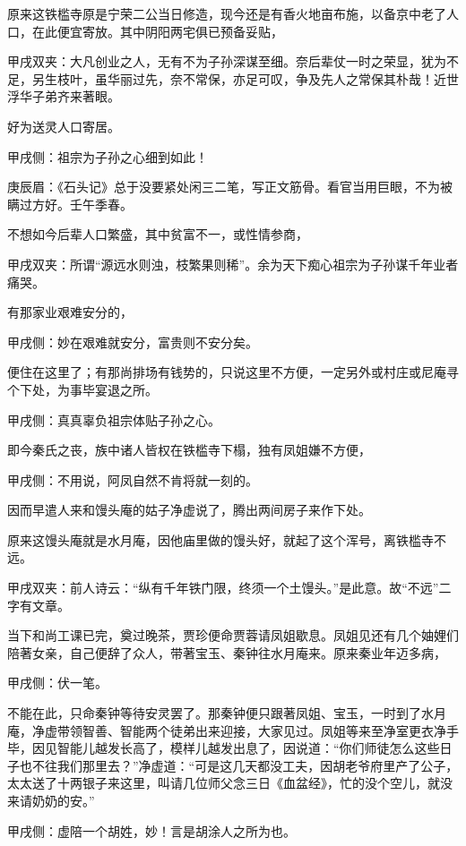 \begin{parag}
    原来这铁槛寺原是宁荣二公当日修造，现今还是有香火地亩布施，以备京中老了人口，在此便宜寄放。其中阴阳两宅俱已预备妥贴，\begin{note}甲戌双夹：大凡创业之人，无有不为子孙深谋至细。奈后辈仗一时之荣显，犹为不足，另生枝叶，虽华丽过先，奈不常保，亦足可叹，争及先人之常保其朴哉！近世浮华子弟齐来著眼。\end{note}好为送灵人口寄居。\begin{note}甲戌侧：祖宗为子孙之心细到如此！\end{note}\begin{note}庚辰眉：《石头记》总于没要紧处闲三二笔，写正文筋骨。看官当用巨眼，不为被瞒过方好。壬午季春。\end{note}不想如今后辈人口繁盛，其中贫富不一，或性情参商，\begin{note}甲戌双夹：所谓“源远水则浊，枝繁果则稀”。余为天下痴心祖宗为子孙谋千年业者痛哭。\end{note}有那家业艰难安分的，\begin{note}甲戌侧：妙在艰难就安分，富贵则不安分矣。\end{note}便住在这里了；有那尚排场有钱势的，只说这里不方便，一定另外或村庄或尼庵寻个下处，为事毕宴退之所。\begin{note}甲戌侧：真真辜负祖宗体贴子孙之心。\end{note}即今秦氏之丧，族中诸人皆权在铁槛寺下榻，独有凤姐嫌不方便，\begin{note}甲戌侧：不用说，阿凤自然不肯将就一刻的。\end{note}因而早遣人来和馒头庵的姑子净虚说了，腾出两间房子来作下处。
\end{parag}


\begin{parag}
    原来这馒头庵就是水月庵，因他庙里做的馒头好，就起了这个浑号，离铁槛寺不远。\begin{note}甲戌双夹：前人诗云：“纵有千年铁门限，终须一个土馒头。”是此意。故“不远”二字有文章。\end{note}当下和尚工课已完，奠过晚茶，贾珍便命贾蓉请凤姐歇息。凤姐见还有几个妯娌们陪著女亲，自己便辞了众人，带著宝玉、秦钟往水月庵来。原来秦业年迈多病，\begin{note}甲戌侧：伏一笔。\end{note}不能在此，只命秦钟等待安灵罢了。那秦钟便只跟著凤姐、宝玉，一时到了水月庵，净虚带领智善、智能两个徒弟出来迎接，大家见过。凤姐等来至净室更衣净手毕，因见智能儿越发长高了，模样儿越发出息了，因说道：“你们师徒怎么这些日子也不往我们那里去？”净虚道：“可是这几天都没工夫，因胡老爷府里产了公子，太太送了十两银子来这里，叫请几位师父念三日《血盆经》，忙的没个空儿，就没来请奶奶的安。”\begin{note}甲戌侧：虚陪一个胡姓，妙！言是胡涂人之所为也。\end{note}
\end{parag}


